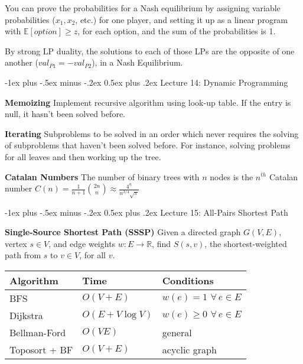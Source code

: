 \documentclass[10pt,landscape]{article}
\makeatletter
\renewcommand{\section}{\@startsection{section}{1}{0mm}%
                                {-1ex plus -.5ex minus -.2ex}%
                                {0.5ex plus .2ex}%
                                {\normalfont\large\bfseries}}
\let\oldforall\forall
\renewcommand{\forall}{\hspace{2pt} \oldforall \hspace{1pt}}
\newcommand{\definition}[1]{\textbf{#1}\hspace{2pt}}
\makeatother
\begin{document}
\begin{multicols}{3}
You can prove the probabilities for a Nash equilibrium by assigning variable probabilities ($x_1, x_2$, etc.) for one player, and setting it up as a linear program with $\mathds{E}[option] \geq z$, for each option, and the sum of the probabilities is 1.

By strong LP duality, the solutions to each of those LPs are the opposite of one another ($val_{P1} = -val_{P2}$), in a Nash Equilibrium.



\section{Lecture 14: Dynamic Programming}

\definition{Memoizing} Implement recursive algorithm using look-up table. If the entry is null, it hasn't been solved before.

\definition{Iterating} Subproblems to be solved in an order which never requires the solving of subproblems that haven't been solved before. For instance, solving problems for all leaves and then working up the tree.

\definition{Catalan Numbers} The number of binary trees with $n$ nodes is the $n^{th}$ Catalan number $C(n) = \frac{1}{n+1} \binom{2n}{n} \approx \frac{4^n}{n^{3/4} \sqrt{\pi}}$



\section{Lecture 15: All-Pairs Shortest Path}

\definition{Single-Source Shortest Path (SSSP)} Given a directed graph $G(V,E)$, vertex $s \in V$, and edge weights $w: E \to \mathds{R}$, find $S(s,v)$, the shortest-weighted path from $s$ to $v \in V$, for all $v$.

\begin{tabular}{lll}
Algorithm & Time & Conditions \\ \hline
BFS & $O(V + E)$ & $w(e) = 1 \forall e \in E$ \\
Dijkstra & $O(E + V \log V)$ & $w(e) \geq 0 \forall e \in E$ \\
Bellman-Ford & $O(VE)$ & general \\
Toposort + BF & $O(V + E)$ & acyclic graph
\end{tabular}


\end{multicols}
\end{document}
